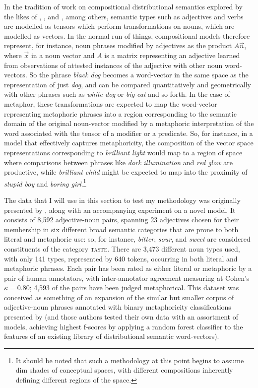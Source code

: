 In the tradition of work on compositional distributional semantics explored by the likes of \cite{MitchellEA2010}, \cite{BaroniEA2010}, and \cite{CoeckeEA2011}, among others, semantic types such as adjectives and verbs are modelled as tensors which perform transformations on nouns, which are modelled as vectors.  In the normal run of things, compositional models therefore represent, for instance, noun phrases modified by adjectives as the product $A\overrightarrow{n}$, where $\overrightarrow{x}$ in a noun vector and $A$ is a matrix representing an adjective learned from observations of attested instances of the adjective with other noun word-vectors.  So the phrase \emph{black dog} becomes a word-vector in the same space as the representation of just \emph{dog}, and can be compared quantitatively and geometrically with other phrases such as \emph{white dog} or \emph{big cat} and so forth.  In the case of metaphor, these transformations are expected to map the word-vector representing metaphoric phrases into a region corresponding to the semantic domain of the original noun-vector modified by a metaphoric interpretation of the word associated with the tensor of a modifier or a predicate.  So, for instance, in a model that effectively captures metaphoricity, the composition of the vector space representations corresponding to \emph{brilliant light} would map to a region of space where comparisons between phrases like \emph{dark illumination} and \emph{red glow} are productive, while \emph{brilliant child} might be expected to map into the proximity of \emph{stupid boy} and \emph{boring girl}.\footnote{It should be noted that such a methodology at this point begins to assume dim shades of  conceptual spaces, with different compositions inherently defining different regions of the space.}

The data that I will use in this section to test my methodology was originally presented by \cite{GutierrezEA2016}, along with an accompanying experiment on a novel model.  It consists of 8,592 adjective-noun pairs, spanning 23 adjectives chosen for their membership in six different broad semantic categories that are prone to both literal and metaphoric use: so, for instance, \emph{bitter}, \emph{sour}, and \emph{sweet} are considered constituents of the category \textsc{taste}.  There are 3,473 different noun types used, with only 141 types, represented by 640 tokens, occurring in both literal and metaphoric phrases.  Each pair has been rated as either literal or metaphoric by a pair of human annotators, with inter-annotator agreement measuring at Cohen's $\kappa = 0.80$; 4,593 of the pairs have been judged metaphorical.  This dataset was conceived as something of an expansion of the similar but smaller corpus of adjective-noun phrases annotated with binary metaphoricity classifications presented by \cite{TsvetkovEA2014} (and those authors tested their own data with an assortment of models, achieving highest f-scores by applying a random forest classifier to the features of an existing library of distributional semantic word-vectors).

